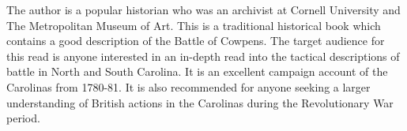 The author is a popular historian who was an archivist at Cornell University and
The Metropolitan Museum of Art.  This is a traditional historical book which
contains a good description of the Battle of Cowpens.  The target audience for
this read is anyone interested in an in-depth read into the tactical
descriptions of battle in North and South Carolina. It is an excellent campaign
account of the Carolinas from 1780-81. It is also recommended for anyone seeking
a larger understanding of British actions in the Carolinas during the
Revolutionary War period.

%


